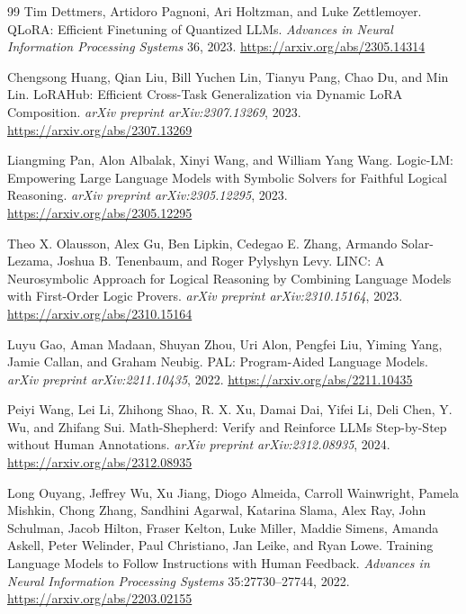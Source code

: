\begin{thebibliography}{99}
Tim Dettmers, Artidoro Pagnoni, Ari Holtzman, and Luke Zettlemoyer. {QLoRA}: Efficient Finetuning of Quantized {LLMs}. \emph{Advances in Neural Information Processing Systems} 36, 2023. \url{https://arxiv.org/abs/2305.14314}

Chengsong Huang, Qian Liu, Bill Yuchen Lin, Tianyu Pang, Chao Du, and Min Lin. {LoRAHub}: Efficient Cross-Task Generalization via Dynamic {LoRA} Composition. \emph{arXiv preprint arXiv:2307.13269}, 2023. \url{https://arxiv.org/abs/2307.13269}

Liangming Pan, Alon Albalak, Xinyi Wang, and William Yang Wang. {Logic-LM}: Empowering Large Language Models with Symbolic Solvers for Faithful Logical Reasoning. \emph{arXiv preprint arXiv:2305.12295}, 2023. \url{https://arxiv.org/abs/2305.12295}

Theo X. Olausson, Alex Gu, Ben Lipkin, Cedegao E. Zhang, Armando Solar-Lezama, Joshua B. Tenenbaum, and Roger Pylyshyn Levy. {LINC}: A Neurosymbolic Approach for Logical Reasoning by Combining Language Models with First-Order Logic Provers. \emph{arXiv preprint arXiv:2310.15164}, 2023. \url{https://arxiv.org/abs/2310.15164}

Luyu Gao, Aman Madaan, Shuyan Zhou, Uri Alon, Pengfei Liu, Yiming Yang, Jamie Callan, and Graham Neubig. {PAL}: Program-Aided Language Models. \emph{arXiv preprint arXiv:2211.10435}, 2022. \url{https://arxiv.org/abs/2211.10435}

Peiyi Wang, Lei Li, Zhihong Shao, R. X. Xu, Damai Dai, Yifei Li, Deli Chen, Y. Wu, and Zhifang Sui. {Math-Shepherd}: Verify and Reinforce {LLMs} Step-by-Step without Human Annotations. \emph{arXiv preprint arXiv:2312.08935}, 2024. \url{https://arxiv.org/abs/2312.08935}

Long Ouyang, Jeffrey Wu, Xu Jiang, Diogo Almeida, Carroll Wainwright, Pamela Mishkin, Chong Zhang, Sandhini Agarwal, Katarina Slama, Alex Ray, John Schulman, Jacob Hilton, Fraser Kelton, Luke Miller, Maddie Simens, Amanda Askell, Peter Welinder, Paul Christiano, Jan Leike, and Ryan Lowe. Training Language Models to Follow Instructions with Human Feedback. \emph{Advances in Neural Information Processing Systems} 35:27730--27744, 2022. \url{https://arxiv.org/abs/2203.02155}


\end{thebibliography}
